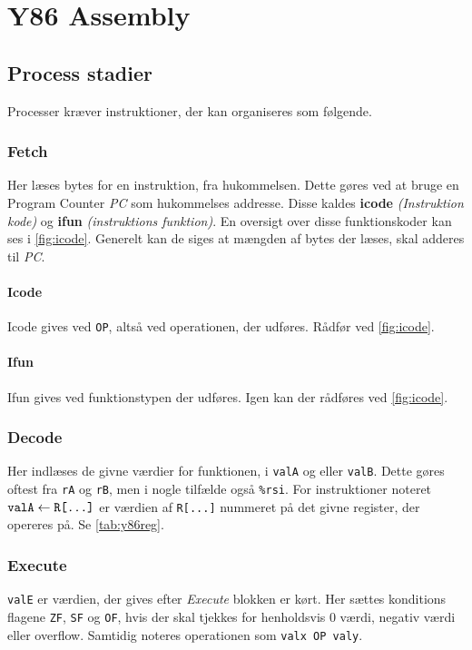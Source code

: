 \section{Y86 Assembly}
\subsection{Process stadier}
Processer kræver instruktioner, der kan organiseres som følgende.
\subsubsection{Fetch}
Her læses bytes for en instruktion, fra hukommelsen.
Dette gøres ved at bruge en Program Counter \textit{PC} som hukommelses addresse.
Disse kaldes \textbf{icode} \textit{(Instruktion kode)} og \textbf{ifun} \textit{(instruktions funktion)}.
En oversigt over disse funktionskoder kan ses i \cref{fig:icode}.
Generelt kan de siges at mængden af bytes der læses, skal adderes til \textit{PC}.
\paragraph{Icode}
Icode gives ved \verb|OP|, altså ved operationen, der udføres.
Rådfør ved \cref{fig:icode}.
\paragraph{Ifun}
Ifun gives ved funktionstypen der udføres. Igen kan der rådføres ved \cref{fig:icode}. 

\subsubsection{Decode}
Her indlæses de givne værdier for funktionen, i \verb|valA| og eller \verb|valB|.
Dette gøres oftest fra \verb|rA| og \verb|rB|, men i nogle tilfælde også \verb|%rsi|.
For instruktioner noteret $\verb|valA|\leftarrow\verb|R[...]|$ er værdien af \verb|R[...]| nummeret på det givne register, der opereres på. Se \cref{tab:y86reg}.

\subsubsection{Execute}
\verb|valE| er værdien, der gives efter \textit{Execute} blokken er kørt.
Her sættes konditions flagene \verb|ZF|, \verb|SF| og \verb|OF|, hvis der skal tjekkes for henholdsvis 0 værdi, negativ værdi eller overflow.
Samtidig noteres operationen som \verb|valx OP valy|.

